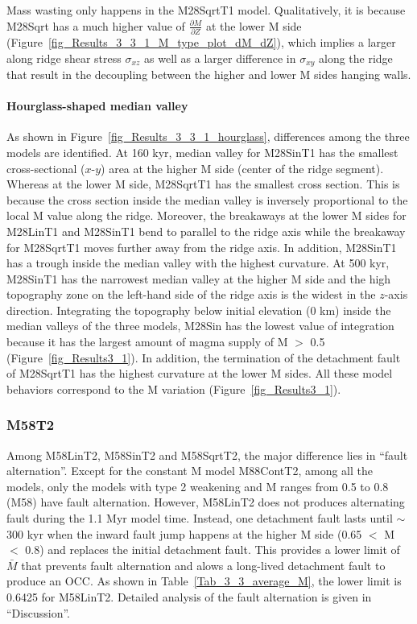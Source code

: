 \documentclass[draft,gc]{agutex}
\begin{document}
\begin{article}
Mass wasting only happens in the M28SqrtT1 model. Qualitatively, it is because M28Sqrt has a much higher value of $\frac{\partial M}{\partial Z}$ at the lower M side (Figure~\ref{fig_Results_3_3_1_M_type_plot_dM_dZ}), which implies a larger along ridge shear stress $\sigma_{xz}$ as well as a larger difference in $\sigma_{xy}$ along the ridge that result in the decoupling between the higher and lower M sides hanging walls.

\paragraph{Hourglass-shaped median valley}
As shown in Figure~\ref{fig_Results_3_3_1_hourglass}, differences among the three models are identified. At 160 kyr, median valley for M28SinT1 has the smallest cross-sectional ($x$-$y$) area at the higher M side (center of the ridge segment). Whereas at the lower M side,  M28SqrtT1 has the smallest cross section. This is because the cross section inside the median valley is inversely proportional to the local M value along the ridge. Moreover, the breakaways at the lower M sides for M28LinT1 and M28SinT1 bend to parallel to the ridge axis while the breakaway for M28SqrtT1 moves further away from the ridge axis. In addition, M28SinT1 has a trough inside the median valley with the highest curvature. At 500 kyr, M28SinT1 has the narrowest median valley at the higher M side and the high topography zone on the left-hand side of the ridge axis is the widest in the $z$-axis direction. Integrating the topography below initial elevation (0 km) inside the median valleys of the three models, M28Sin has the lowest value of integration because it has the largest amount of magma supply of M $>$ 0.5 (Figure~\ref{fig_Results3_1}). In addition, the termination of the detachment fault of M28SqrtT1 has the highest curvature at the lower M sides. All these model behaviors correspond to the M variation (Figure~\ref{fig_Results3_1}).

\subsubsection{M58T2}
Among M58LinT2, M58SinT2 and M58SqrtT2, the major difference lies in ``fault alternation''. Except for the constant M model M88ContT2, among all the models, only the models with type 2 weakening and M ranges from 0.5 to 0.8 (M58) have fault alternation. However, M58LinT2 does not produces alternating fault during the 1.1 Myr model time. Instead, one detachment fault lasts until $\sim$300 kyr when the inward fault jump happens at the higher M side (0.65 $<$ M $<$ 0.8) and replaces the initial detachment fault. This provides a lower limit of $\bar{M}$ that prevents fault alternation and alows a long-lived detachment fault to produce an OCC. As shown in Table~\ref{Tab_3_3_average_M}, the lower limit is 0.6425 for M58LinT2. Detailed analysis of the fault alternation is given in ``Discussion''.


\end{article}
\end{document}
